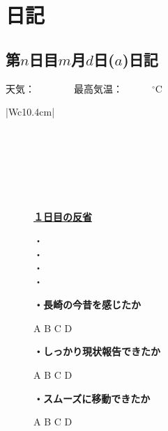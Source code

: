 \section{日記}
\centering
\subsection*{第$ n $日目$ m $月$ d $日($ a $)日記}
\vspace{0.5cm}
\vspace{0.25cm}

\begin{rightline}
	{\scriptsize{天気：　　　　最高気温：　　　$ {}^\circ $C}}
\end{rightline}
\begin{table}[H]
	\begin{tabular}{|Wc{10.4cm}|} \hline
		\\ \hline
		\\ \hline
		\\ \hline
		\\ \hline
		\\ \hline
		\\ \hline
		\\ \hline
	\end{tabular}
\end{table}
\begin{figure}[H]
	\begin{minipage}[b]{0.45\hsize}
		\begin{boxnote}
			\vspace{-0.2cm}
			\begin{center}
				\underline{\footnotesize{\textbf{１日目の反省}}}
			\end{center}
			\vspace{-0.4cm}
			
			\fontsize{12pt}{25pt}\selectfont
			・\\
			・\\
			・\\
			・
		\end{boxnote}
	\end{minipage}
	\hfill
	\begin{minipage}[b]{0.45\hsize}
		\begin{screen}
			\vspace{0.5cm}
			\scriptsize{\textbf{・長崎の今昔を感じたか}}
			\begin{center}
				A \quad B \quad C \quad D
			\end{center}
			\scriptsize{\textbf{・しっかり現状報告できたか}}
			\begin{center}
				A \quad B \quad C \quad D
			\end{center}
			\scriptsize{\textbf{・スムーズに移動できたか}}
			\begin{center}
				A \quad B \quad C \quad D
			\end{center}
			\vspace{0.05cm}
		\end{screen}
	\end{minipage}
\end{figure}

